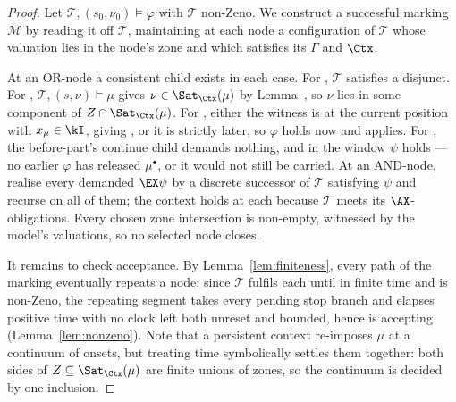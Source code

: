 \begin{proof}



Let $\mathcal{T},(s_0,\nu_0)\models\varphi$ with $\mathcal{T}$ non-Zeno. We construct a
successful marking $\mathcal{M}$ by reading it off $\mathcal{T}$, maintaining at each node a
configuration of $\mathcal{T}$ whose valuation lies in the node's zone and which satisfies its
$\Gamma$ and $\Ctx$.



At an OR-node a consistent child exists in each case. For , $\mathcal{T}$ satisfies a
disjunct. For , $\mathcal{T},(s,\nu)\models\mu$ gives
$\nu\in\Sat_{\Ctx}(\mu)$ by Lemma~, so $\nu$ lies in some component of
$Z\cap\Sat_{\Ctx}(\mu)$. For , either the witness is at the current position
with $x_\mu\in\kI$, giving , or it is strictly later, so $\varphi$ holds now and 
applies. For , the before-part's continue child demands nothing, and in the
window $\psi$ holds --- no earlier $\varphi$ has released $\mu^\bullet$, or it would not still
be carried. At an AND-node, realise every demanded $\EX\psi$ by a discrete successor of $\mathcal{T}$
satisfying $\psi$ and recurse on all of them; the context holds at each because $\mathcal{T}$
meets its $\AX$-obligations. Every chosen zone intersection is non-empty, witnessed by the
model's valuations, so no selected node closes.

It remains to check acceptance. By Lemma~\ref{lem:finiteness}, every path of the marking eventually repeats a
node; since $\mathcal{T}$ fulfils each until in finite time and is non-Zeno, the repeating
segment takes every pending stop branch and elapses positive time with no clock left both
unreset and bounded, hence is accepting (Lemma~\ref{lem:nonzeno}). Note that a persistent context re-imposes $\mu$ at a continuum of onsets, but treating time
symbolically settles them together: both sides of $Z\subseteq\Sat_{\Ctx}(\mu)$ are finite
unions of zones, so the continuum is decided by one inclusion.

%


\end{proof}
